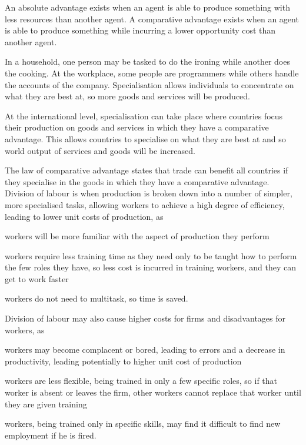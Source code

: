 \documentclass[Economics.tex]{subfiles}
\begin{document}
An absolute advantage exists when an agent is able to produce something with less resources than another agent. A comparative advantage exists when an agent is able to produce something while incurring a lower opportunity cost than another agent.

In a household, one person may be tasked to do the ironing while another does the cooking. At the workplace, some people are programmers while others handle the accounts of the company. Specialisation allows individuals to concentrate on what they are best at, so more goods and services will be produced.

At the international level, specialisation can take place where countries focus their production on goods and services in which they have a comparative advantage. This allows countries to specialise on what they are best at and so world output of services and goods will be increased.

The law of comparative advantage states that trade can benefit all countries if they specialise in the goods in which they have a comparative advantage.
Division of labour is when production is broken down into a number of simpler, more specialised tasks, allowing workers to achieve a high degree of efficiency, leading to lower unit costs of production, as
\begin{slinenum}
    \item workers will be more familiar with the aspect of production they perform
    \item workers require less training time as they need only to be taught how to perform the few roles they have, so less cost is incurred in training workers, and they can get to work faster
    \item workers do not need to multitask, so time is saved.
\end{slinenum}

Division of labour may also cause higher costs for firms and disadvantages for workers, as
\begin{slinenum}
    \item workers may become complacent or bored, leading to errors and a decrease in productivity, leading potentially to higher unit cost of production
    \item workers are less flexible, being trained in only a few specific roles, so if that worker is absent or leaves the firm, other workers cannot replace that worker until they are given training
    \item workers, being trained only in specific skills, may find it difficult to find new employment if he is fired.
\end{slinenum}
\end{document}
